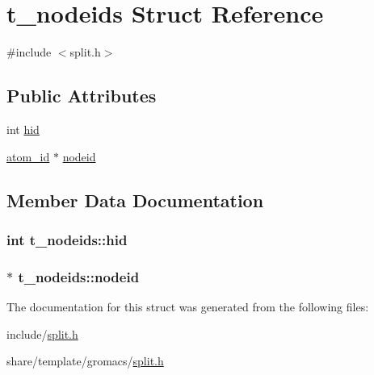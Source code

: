 \hypertarget{structt__nodeids}{\section{t\-\_\-nodeids \-Struct \-Reference}
\label{structt__nodeids}
}


{\ttfamily \#include $<$split.\-h$>$}

\subsection*{\-Public \-Attributes}
\begin{DoxyCompactItemize}
\item 
int \hyperlink{structt__nodeids_a3be50d3cf4b6ee43b53199f455094d4e}{hid}
\item 
\hyperlink{include_2types_2simple_8h_ad3f47cdb48677e516e2049719612c737}{atom\-\_\-id} $\ast$ \hyperlink{structt__nodeids_a597884a76a4bf4c114fec36051cd682d}{nodeid}
\end{DoxyCompactItemize}


\subsection{\-Member \-Data \-Documentation}
\hypertarget{structt__nodeids_a3be50d3cf4b6ee43b53199f455094d4e}{
\subsubsection[{hid}]{\setlength{\rightskip}{0pt plus 5cm}int {\bf t\-\_\-nodeids\-::hid}}}\label{structt__nodeids_a3be50d3cf4b6ee43b53199f455094d4e}
\hypertarget{structt__nodeids_a597884a76a4bf4c114fec36051cd682d}{
\subsubsection[{nodeid}]{ $\ast$ {\bf t\-\_\-nodeids\-::nodeid}}}\label{structt__nodeids_a597884a76a4bf4c114fec36051cd682d}


\-The documentation for this struct was generated from the following files\-:\begin{DoxyCompactItemize}
\item 
include/\hyperlink{include_2split_8h}{split.\-h}\item 
share/template/gromacs/\hyperlink{share_2template_2gromacs_2split_8h}{split.\-h}\end{DoxyCompactItemize}
